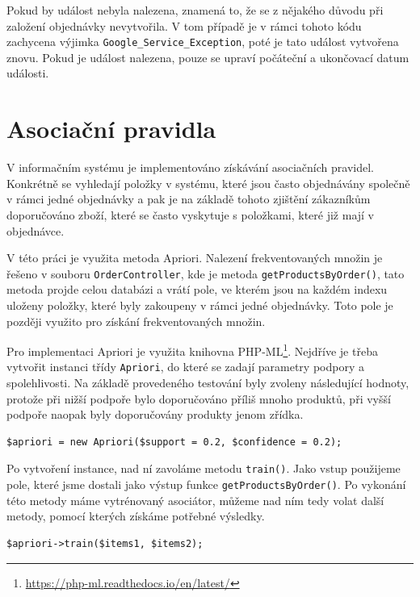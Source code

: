 Pokud by událost nebyla nalezena, znamená to, že se z nějakého důvodu při založení objednávky nevytvořila. V tom případě je v rámci tohoto kódu zachycena výjimka \texttt{Google\_Service\_Exception}, poté je tato událost vytvořena znovu. Pokud je událost nalezena, pouze se upraví počáteční a ukončovací datum události.



\section{Asociační pravidla}

V informačním systému je implementováno získávání asociačních pravidel. Konkrétně se vyhledají položky v systému, které jsou často objednávány společně v rámci jedné objednávky a pak je na základě tohoto zjištění zákazníkům doporučováno zboží, které se často vyskytuje s položkami, které již mají v objednávce.

V této práci je využita metoda Apriori. Nalezení frekventovaných množin je řešeno v souboru \texttt{OrderController}, kde je metoda \texttt{getProductsByOrder()}, tato metoda projde celou databázi a vrátí pole, ve kterém jsou na každém indexu uloženy položky, které byly zakoupeny v rámci jedné objednávky. Toto pole je později využito pro získání frekventovaných množin.

Pro implementaci Apriori je využita knihovna PHP-ML\footnote{\url{https://php-ml.readthedocs.io/en/latest/}}. Nejdříve je třeba vytvořit instanci třídy \texttt{Apriori}, do které se zadají parametry podpory a spolehlivosti. Na základě provedeného testování byly zvoleny následující hodnoty, protože při nižší podpoře bylo doporučováno příliš mnoho produktů, při vyšší podpoře naopak byly doporučovány produkty jenom zřídka. 

\begin{verbatim}
$apriori = new Apriori($support = 0.2, $confidence = 0.2); 
\end{verbatim}

 Po vytvoření instance, nad ní zavoláme metodu \texttt{train()}. Jako vstup použijeme pole, které jsme dostali jako výstup funkce \texttt{getProductsByOrder()}. Po vykonání této metody máme vytrénovaný asociátor, můžeme nad ním tedy volat další metody, pomocí kterých získáme potřebné výsledky.

\begin{verbatim}
$apriori->train($items1, $items2);
\end{verbatim}

